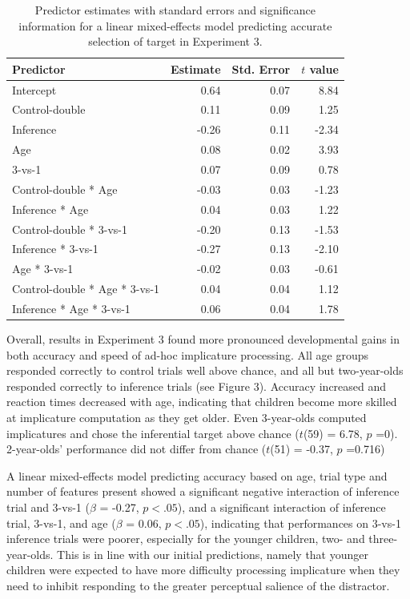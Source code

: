 \documentclass[a4paper,man,apacite,floatsintext]{apa6}
\begin{document}
\begin{table}[tb]
\centering
\begin{tabular}{lrrr}
 Predictor & Estimate & Std. Error & $t$ value \\ 
  \hline
Intercept & 0.64 & 0.07 & 8.84 \\ 
  Control-double & 0.11 & 0.09 & 1.25 \\ 
  Inference & -0.26 & 0.11 & -2.34 \\ 
  Age & 0.08 & 0.02 & 3.93 \\ 
  3-vs-1 & 0.07 & 0.09 & 0.78 \\ 
  Control-double * Age & -0.03 & 0.03 & -1.23 \\ 
  Inference * Age & 0.04 & 0.03 & 1.22 \\ 
  Control-double * 3-vs-1 & -0.20 & 0.13 & -1.53 \\ 
  Inference * 3-vs-1 & -0.27 & 0.13 & -2.10 \\ 
  Age * 3-vs-1 & -0.02 & 0.03 & -0.61 \\ 
  Control-double * Age * 3-vs-1 & 0.04 & 0.04 & 1.12 \\ 
  Inference * Age * 3-vs-1 & 0.06 & 0.04 & 1.78 \\ 
   \hline
\end{tabular}
\caption{Predictor estimates with standard errors and significance information for a linear mixed-effects model predicting accurate selection of target in Experiment 3.} 
\label{tab:exp3_tab}
\end{table}

Overall, results in Experiment 3 found more pronounced developmental
gains in both accuracy and speed of ad-hoc implicature processing. All
age groups responded correctly to control trials well above chance, and
all but two-year-olds responded correctly to inference trials (see
Figure 3). Accuracy increased and reaction times decreased with age,
indicating that children become more skilled at implicature computation
as they get older. Even 3-year-olds computed implicatures and chose the
inferential target above chance (\(t\)(59) = 6.78, \(p\) =0).
2-year-olds' performance did not differ from chance (\(t\)(51) = -0.37,
\(p\) =0.716)

A linear mixed-effects model predicting accuracy based on age, trial
type and number of features present showed a significant negative
interaction of inference trial and 3-vs-1 (\(\beta\) = -0.27,
\(p <.05\)), and a significant interaction of inference trial, 3-vs-1,
and age (\(\beta\) = 0.06, \(p <.05\)), indicating that performances on
3-vs-1 inference trials were poorer, especially for the younger
children, two- and three-year-olds. This is in line with our initial
predictions, namely that younger children were expected to have more
difficulty processing implicature when they need to inhibit responding
to the greater perceptual salience of the distractor.
\end{document}
